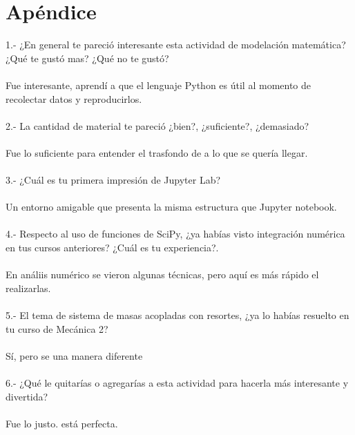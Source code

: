 \documentclass{article}
\begin{document}
\section{Apéndice}

1.- ¿En general te pareció interesante esta actividad de modelación matemática? ¿Qué te gustó mas? ¿Qué no te gustó?
\\
\\
Fue interesante, aprendí a que el lenguaje Python es útil al momento de recolectar datos y reproducirlos.
\\
\\
2.- La cantidad de material te pareció ¿bien?, ¿suficiente?, ¿demasiado?
\\
\\
Fue lo suficiente para entender el trasfondo de a lo que se quería llegar.
\\
\\
3.- ¿Cuál es tu primera impresión de Jupyter Lab? 
\\
\\
Un entorno amigable que presenta la misma estructura que Jupyter notebook.
\\
\\
4.- Respecto al uso de funciones de SciPy, ¿ya habías visto integración numérica en tus cursos anteriores? ¿Cuál es tu experiencia?.
\\
\\
En análiis numérico se vieron algunas técnicas, pero aquí es más rápido el realizarlas.
\\
\\
5.- El tema de sistema de masas acopladas con resortes, ¿ya lo habías resuelto en tu curso de Mecánica 2?  
\\
\\
Sí, pero se una manera diferente
\\
\\
6.- ¿Qué le quitarías o agregarías a esta actividad para hacerla más interesante y divertida?
\\
\\
Fue lo justo. está perfecta.
\end{document}
